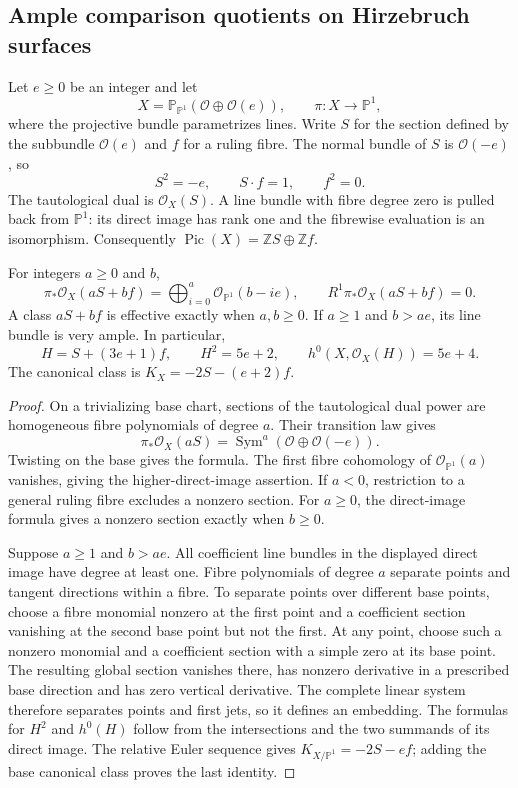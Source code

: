 \subsection{Ample comparison quotients on Hirzebruch surfaces}
\label{subsec:hirzebruch-ample-comparison}

Let $e\geq0$ be an integer and let
\[
 X=\mathbb P_{\mathbb P^1}(\mathcal O\oplus\mathcal O(e)),
 \qquad \pi:X\longrightarrow\mathbb P^1,
\]
where the projective bundle parametrizes lines. Write $S$ for the section defined by the subbundle $\mathcal O(e)$ and $f$ for a ruling fibre. The normal bundle of $S$ is $\mathcal O(-e)$, so
\[
 S^2=-e,\qquad S\cdot f=1,\qquad f^2=0.
\]
The tautological dual is $\mathcal O_X(S)$. A line bundle with fibre degree zero is pulled back from $\mathbb P^1$: its direct image has rank one and the fibrewise evaluation is an isomorphism. Consequently $\operatorname{Pic}(X)=\mathbb ZS\oplus\mathbb Zf$.

\begin{lemma}\label{lem:hirzebruch-ruling-sections}
For integers $a\geq0$ and $b$,
\[
 \pi_*\mathcal O_X(aS+bf)=
 \bigoplus_{i=0}^a\mathcal O_{\mathbb P^1}(b-ie),
 \qquad R^1\pi_*\mathcal O_X(aS+bf)=0.
\]
A class $aS+bf$ is effective exactly when $a,b\geq0$. If $a\geq1$ and $b>ae$, its line bundle is very ample. In particular,
\[
 H=S+(3e+1)f,
 \qquad H^2=5e+2,
 \qquad h^0(X,\mathcal O_X(H))=5e+4.
\]
The canonical class is $K_X=-2S-(e+2)f$.
\end{lemma}
\begin{proof}
On a trivializing base chart, sections of the tautological dual power are homogeneous fibre polynomials of degree $a$. Their transition law gives
\[
 \pi_*\mathcal O_X(aS)=
 \operatorname{Sym}^a(\mathcal O\oplus\mathcal O(-e)).
\]
Twisting on the base gives the formula. The first fibre cohomology of $\mathcal O_{\mathbb P^1}(a)$ vanishes, giving the higher-direct-image assertion. If $a<0$, restriction to a general ruling fibre excludes a nonzero section. For $a\geq0$, the direct-image formula gives a nonzero section exactly when $b\geq0$.

Suppose $a\geq1$ and $b>ae$. All coefficient line bundles in the displayed direct image have degree at least one. Fibre polynomials of degree $a$ separate points and tangent directions within a fibre. To separate points over different base points, choose a fibre monomial nonzero at the first point and a coefficient section vanishing at the second base point but not the first. At any point, choose such a nonzero monomial and a coefficient section with a simple zero at its base point. The resulting global section vanishes there, has nonzero derivative in a prescribed base direction and has zero vertical derivative. The complete linear system therefore separates points and first jets, so it defines an embedding. The formulas for $H^2$ and $h^0(H)$ follow from the intersections and the two summands of its direct image. The relative Euler sequence gives $K_{X/\mathbb P^1}=-2S-ef$; adding the base canonical class proves the last identity.
\end{proof}

